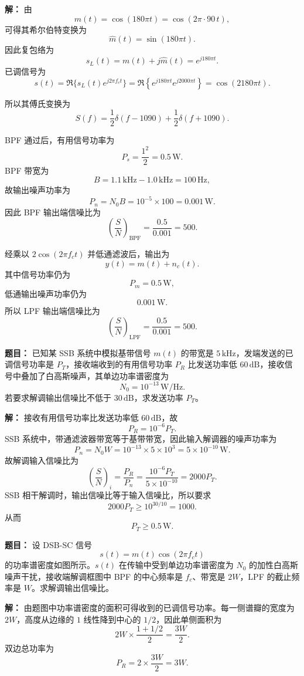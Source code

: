 \par\textbf{解：}
由
\[
m(t)=\cos(180\pi t)=\cos(2\pi\cdot 90\,t),
\]
可得其希尔伯特变换为
\[
\hat m(t)=\sin(180\pi t).
\]
因此复包络为
\[
s_L(t)=m(t)+j\hat m(t)=e^{j180\pi t}.
\]
已调信号为
\[
s(t)=\Re\{s_L(t)e^{j2\pi f_ct}\}
=\Re\left\{e^{j180\pi t}e^{j2000\pi t}\right\}
=\cos(2180\pi t).
\]

所以其傅氏变换为
\[
S(f)=\frac12\delta(f-1090)+\frac12\delta(f+1090).
\]

BPF 通过后，有用信号功率为
\[
P_s=\frac{1^2}{2}=0.5\,\mathrm{W}.
\]
BPF 带宽为
\[
B=1.1\,\mathrm{kHz}-1.0\,\mathrm{kHz}=100\,\mathrm{Hz},
\]
故输出噪声功率为
\[
P_n=N_0B=10^{-5}\times 100=0.001\,\mathrm{W}.
\]
因此 BPF 输出端信噪比为
\[
\left(\frac{S}{N}\right)_{\mathrm{BPF}}=\frac{0.5}{0.001}=500.
\]

经乘以 $2\cos(2\pi f_ct)$ 并低通滤波后，输出为
\[
y(t)=m(t)+n_c(t).
\]
其中信号功率仍为
\[
P_m=0.5\,\mathrm{W},
\]
低通输出噪声功率仍为
\[
0.001\,\mathrm{W}.
\]
所以 LPF 输出端信噪比为
\[
\left(\frac{S}{N}\right)_{\mathrm{LPF}}=\frac{0.5}{0.001}=500.
\]

\medskip
{}
\textbf{题目：}
已知某 SSB 系统中模拟基带信号 $m(t)$ 的带宽是 $5\,\mathrm{kHz}$，发端发送的已调信号功率是 $P_T$，接收端收到的有用信号功率 $P_R$ 比发送功率低 $60\,\mathrm{dB}$，接收信号中叠加了白高斯噪声，其单边功率谱密度为
\[
N_0=10^{-13}\,\mathrm{W/Hz}.
\]
若要求解调输出信噪比不低于 $30\,\mathrm{dB}$，求发送功率 $P_T$。

\par\textbf{解：}
接收有用信号功率比发送功率低 $60\,\mathrm{dB}$，故
\[
P_R=10^{-6}P_T.
\]
SSB 系统中，带通滤波器带宽等于基带带宽，因此输入解调器的噪声功率为
\[
P_n=N_0W=10^{-13}\times 5\times 10^3=5\times 10^{-10}\,\mathrm{W}.
\]
故解调输入信噪比为
\[
\left(\frac{S}{N}\right)_i=\frac{P_R}{P_n}
=\frac{10^{-6}P_T}{5\times 10^{-10}}
=2000P_T.
\]
SSB 相干解调时，输出信噪比等于输入信噪比，所以要求
\[
2000P_T\ge 10^{30/10}=1000.
\]
从而
\[
P_T\ge 0.5\,\mathrm{W}.
\]

\medskip
{}
\textbf{题目：}
设 DSB-SC 信号
\[
s(t)=m(t)\cos(2\pi f_ct)
\]
的功率谱密度如图所示。$s(t)$ 在传输中受到单边功率谱密度为 $N_0$ 的加性白高斯噪声干扰，接收端解调框图中 BPF 的中心频率是 $f_c$、带宽是 $2W$，LPF 的截止频率是 $W$。求解调输出信噪比。

\par\textbf{解：}
由题图中功率谱密度的面积可得收到的已调信号功率。每一侧谱瓣的宽度为 $2W$，高度从边缘的 $1$ 线性降到中心的 $1/2$，因此单侧面积为
\[
2W\times \frac{1+1/2}{2}=\frac{3W}{2}.
\]
双边总功率为
\[
P_R=2\times \frac{3W}{2}=3W.
\]

